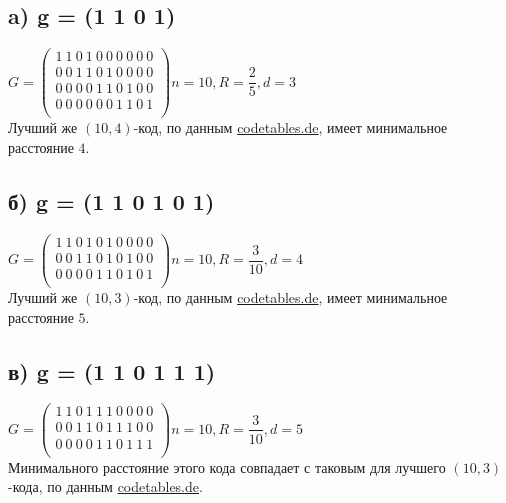 \documentclass[fontsize=12pt]{article}
\begin{document}
\subsection*{a) g = (1 1 0 1)}

$G = \begin{pmatrix}
1\ 1\ 0\ 1\ 0\ 0\ 0\ 0\ 0\ 0\\
0\ 0\ 1\ 1\ 0\ 1\ 0\ 0\ 0\ 0\\
0\ 0\ 0\ 0\ 1\ 1\ 0\ 1\ 0\ 0\\
0\ 0\ 0\ 0\ 0\ 0\ 1\ 1\ 0\ 1\\
\end{pmatrix} n = 10, R = \dfrac{2}{5}, d = 3$\\
 
Лучший же $(10, 4)$-код, по данным \href{http://www.codetables.de}{codetables.de}, имеет минимальное расстояние $4$. 

\subsection*{б) g = (1 1 0 1 0 1)}

$G = \begin{pmatrix}
1\ 1\ 0\ 1\ 0\ 1\ 0\ 0\ 0\ 0\\
0\ 0\ 1\ 1\ 0\ 1\ 0\ 1\ 0\ 0\\
0\ 0\ 0\ 0\ 1\ 1\ 0\ 1\ 0\ 1\\
\end{pmatrix} n = 10, R = \dfrac{3}{10}, d = 4$\\
 
Лучший же $(10, 3)$-код, по данным \href{http://www.codetables.de}{codetables.de}, имеет минимальное расстояние $5$. 

\subsection*{в) g = (1 1 0 1 1 1)}

$G = \begin{pmatrix}
1\ 1\ 0\ 1\ 1\ 1\ 0\ 0\ 0\ 0\\
0\ 0\ 1\ 1\ 0\ 1\ 1\ 1\ 0\ 0\\
0\ 0\ 0\ 0\ 1\ 1\ 0\ 1\ 1\ 1\\
\end{pmatrix} n = 10, R = \dfrac{3}{10}, d = 5$\\
 
 Минимального расстояние этого кода совпадает с таковым для лучшего $(10, 3)$-кода, по данным \href{http://www.codetables.de}{codetables.de}.
\end{document}
